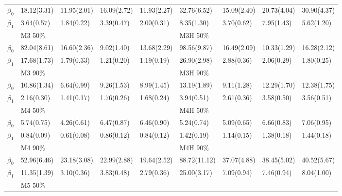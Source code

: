 \documentclass[12pt]{article}
\begin{document}
\begin{center}
\begin{table}[h]
\begin{tabular}[tb]{c|llll|llll}
      $\beta_0$ & 18.12(3.31)   & 11.95(2.01) & 16.09(2.72) & 11.93(2.27) & 32.76(6.52)  & 15.09(2.40) & 20.73(4.04) & 30.90(4.37) \\
      $\beta_1$ & 3.64(0.57)    & 1.84(0.22)  & 3.39(0.47)  & 2.00(0.31)  & 8.35(1.30)   & 3.70(0.62)  & 7.95(1.43)  & 5.62(1.20)  \\
      \hline
                & M3 50\%       &             &             &             & M3H 50\%     &             &             &             \\
      $\beta_0$ & 82.04(8.61)   & 16.60(2.36) & 9.02(1.40)  & 13.68(2.29) & 98.56(9.87)  & 16.49(2.09) & 10.33(1.29) & 16.28(2.12) \\
      $\beta_1$ & 17.68(1.73)   & 1.79(0.33)  & 1.21(0.20)  & 1.19(0.19)  & 26.90(2.98)  & 2.88(0.36)  & 2.06(0.29)  & 1.80(0.25)  \\
                & M3 90\%       &             &             &             & M3H 90\%     &             &             &             \\
      $\beta_0$ & 10.86(1.34)   & 6.64(0.99)  & 9.26(1.53)  & 8.99(1.45)  & 13.19(1.89)  & 9.11(1.28)  & 12.29(1.70) & 12.38(1.75) \\
      $\beta_1$ & 2.16(0.30)    & 1.41(0.17)  & 1.76(0.26)  & 1.68(0.24)  & 3.94(0.51)   & 2.61(0.36)  & 3.58(0.50)  & 3.56(0.51)  \\
      \hline
                & M4 50\%       &             &             &             & M4H 50\%     &             &             &             \\
      $\beta_0$ & 5.74(0.75)    & 4.26(0.61)  & 6.47(0.87)  & 6.46(0.90)  & 5.24(0.74)   & 5.09(0.65)  & 6.66(0.83)  & 7.06(0.95)  \\
      $\beta_1$ & 0.84(0.09)    & 0.61(0.08)  & 0.86(0.12)  & 0.84(0.12)  & 1.42(0.19)   & 1.14(0.15)  & 1.38(0.18)  & 1.44(0.18)  \\
                & M4 90\%       &             &             &             & M4H 90\%     &             &             &             \\
      $\beta_0$ & 52.96(6.46)   & 23.18(3.08) & 22.99(2.88) & 19.64(2.52) & 88.72(11.12) & 37.07(4.88) & 38.45(5.02) & 40.52(5.67) \\
      $\beta_1$ & 11.35(1.39)   & 3.10(0.36)  & 3.83(0.48)  & 2.79(0.36)  & 25.00(3.17)  & 7.09(0.94)  & 7.46(0.94)  & 8.04(1.00)  \\
      \hline
                & M5 50\%       &             &             &             &              &             &             &             \\

\end{tabular}
\end{table}
\end{center}
\end{document}
